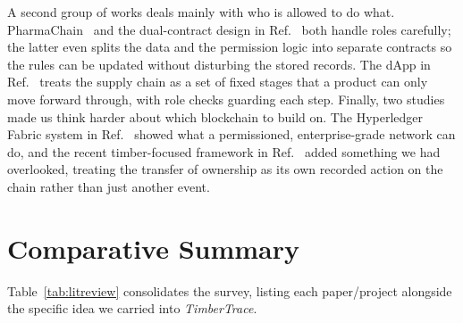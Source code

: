 A second group of works deals mainly with who is allowed to do what.
PharmaChain~\cite{pharmachain} and the dual-contract design in
Ref.~\cite{dualcontract} both handle roles carefully; the latter even
splits the data and the permission logic into separate contracts so the
rules can be updated without disturbing the stored records. The dApp in
Ref.~\cite{faizack} treats the supply chain as a set of fixed stages that
a product can only move forward through, with role checks guarding each
step. Finally, two studies made us think harder about which blockchain to
build on. The Hyperledger Fabric system in Ref.~\cite{hyperledger} showed
what a permissioned, enterprise-grade network can do, and the recent
timber-focused framework in Ref.~\cite{timberSC2025} added something we
had overlooked, treating the transfer of ownership as its own recorded
action on the chain rather than just another event.

\section{Comparative Summary}

Table~\ref{tab:litreview} consolidates the survey, listing each
paper/project alongside the specific idea we carried into
\emph{TimberTrace}.

